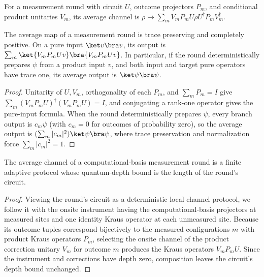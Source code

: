 \begin{definition}
    \label{def:qc_measurement_round_channel}
    \leanok
    For a measurement round with circuit $U$, outcome projectors $P_m$, and
    conditional product unitaries $V_m$, its average channel is
    $\rho\mapsto\sum_m V_mP_mU\rho U^{\dagger}P_mV_m^{\dagger}$.
\end{definition}

\begin{lemma}
    \label{thm:qc_measurement_round_channel}
    \leanok
    The average map of a measurement round is trace preserving and
    completely positive. On a pure input $\ket v\bra v$, its output is
    $\sum_m\ket{V_mP_mUv}\bra{V_mP_mUv}$. In particular, if the round
    deterministically prepares $\psi$ from a product input $v$, and both
    input and target pure operators have trace one, its average output is
    $\ket\psi\bra\psi$.
\end{lemma}
\begin{proof}
    \leanok
    Unitarity of $U,V_m$, orthogonality of each $P_m$, and
    $\sum_mP_m=I$ give
    $\sum_m(V_mP_mU)^{\dagger}(V_mP_mU)=I$, and conjugating a rank-one
    operator gives the pure-input formula.
    When the round deterministically prepares $\psi$, every branch output is
    $c_m\psi$ (with $c_m=0$ for outcomes of probability zero), so the average
    output is $(\sum_m|c_m|^2)\ket\psi\bra\psi$, where trace preservation and
    normalization force $\sum_m|c_m|^2=1$.
\end{proof}

\begin{lemma}
    \label{thm:qc_measurement_round_adaptive}
    \leanok
    The average channel of a computational-basis measurement round is a
    finite adaptive protocol whose quantum-depth bound is the length of
    the round's circuit.
\end{lemma}
\begin{proof}
    \leanok
    Viewing the round's circuit as a deterministic local channel protocol,
    we follow it with the onsite instrument having the computational-basis
    projectors at measured sites and one identity Kraus operator at each
    unmeasured site. Because its outcome tuples correspond bijectively to the
    measured configurations $m$ with product Kraus operators $P_m$,
    selecting the onsite channel of the product correction unitary $V_m$ for
    outcome $m$ produces the Kraus operators $V_mP_mU$. Since the instrument
    and corrections have depth zero, composition leaves the circuit's depth
    bound unchanged.
\end{proof}
